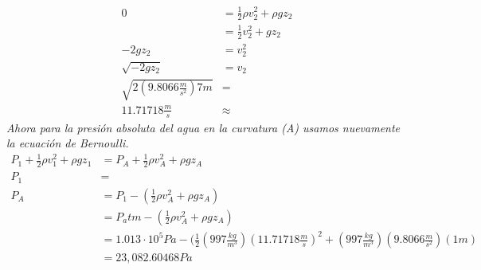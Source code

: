 \documentclass{article}
\begin{document}
\begin{align*}
    0 &= \frac{1}{2}\rho v_2^2 + \rho gz_2 \\
      &= \frac{1}{2}v_2^2 + gz_2 \\
    -2gz_2 &= v_2^2 \\
    \sqrt{-2gz_2} &= v_2 \\
    \sqrt{2(9.8066\frac{m}{s^2})7m} &= \\
    11.71718 \frac{m}{s} &\approx
\end{align*}
\textit{Ahora para la presión absoluta del agua en la curvatura (A) usamos nuevamente la ecuación de Bernoulli.}
\begin{align*}
    P_1 + \frac{1}{2}\rho v_1^2 + \rho gz_1 &= P_A + \frac{1}{2}\rho v_A^2 + \rho gz_A \\
    P_1 &= \\
    P_A &= P_1 - (\frac{1}{2}\rho v_A^2 + \rho gz_A) \\
    &= P_atm - (\frac{1}{2}\rho v_A^2 + \rho gz_A)  \\
    &= 1.013\cdot10^5 Pa - (\frac{1}{2}(997\frac{kg}{m^3}) (11.71718 \frac{m}{s})^2 + (997\frac{kg}{m^3}) (9.8066\frac{m}{s^2})(1m)  \\
    &= 23,082.60468 Pa
\end{align*}
\end{document}
